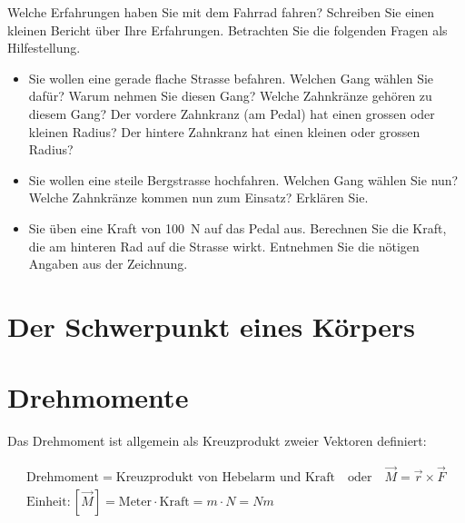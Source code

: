 \documentclass[12pt,a4paper,twoside]{article}
\def\dir{./Aufgaben_Mechanik/}
\newcommand{\Einbinden}[1]{}
\begin{document}
\begin{aufgabe}
	Welche Erfahrungen haben Sie mit dem Fahrrad fahren? Schreiben Sie einen kleinen Bericht über Ihre Erfahrungen.
	Betrachten Sie die folgenden Fragen als Hilfestellung.
	\begin{itemize}
		\item	Sie wollen eine gerade flache Strasse befahren. Welchen Gang wählen Sie dafür? Warum nehmen Sie diesen Gang?
		Welche Zahnkränze gehören zu diesem Gang? Der vordere Zahnkranz (am Pedal) hat einen grossen oder kleinen Radius?
		Der hintere Zahnkranz hat einen kleinen oder grossen Radius?

		\item Sie wollen eine steile Bergstrasse hochfahren. Welchen Gang wählen Sie nun? Welche Zahnkränze kommen nun zum Einsatz?
			Erklären Sie.

		\item Sie üben eine Kraft von \SI{100}{N} auf das Pedal aus.
			Berechnen Sie die Kraft, die am hinteren Rad auf die Strasse wirkt. Entnehmen Sie die nötigen Angaben aus der Zeichnung.
	
	\end{itemize}


	\begin{center}
	\end{center}

\end{aufgabe}




\section*{Der Schwerpunkt eines Körpers}
\Einbinden{\dir/schwerpunkt01.tex}%
\Einbinden{\dir/schwerpunkt02.tex}%


\section*{Drehmomente}
Das Drehmoment ist allgemein als Kreuzprodukt zweier Vektoren definiert:

\begin{cbox}
\begin{gather*}
	\text{Drehmoment} = \text{Kreuzprodukt von Hebelarm und Kraft} \quad\text{oder}\quad \vec{M} = \vec{r}\times\vec{F}\\
	\text{Einheit}: [\vec{M}]=\text{Meter}\cdot\text{Kraft}=\si{m}\cdot\si{N}=\si{Nm}
\end{gather*}
\end{cbox}
\end{document}
